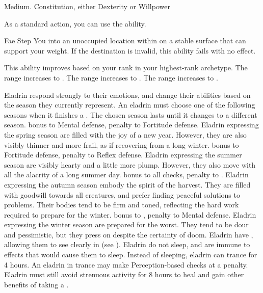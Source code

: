          Medium.
          Constitution, either  Dexterity or  Willpower
        \begin{raggeditemize}
             As a standard action, you can use the  ability.
            \begin{magicalactiveability}{Fae Step}
                \rankline
                You  into an unoccupied location within \shortrange on a stable surface that can support your weight.
                If the destination is invalid, this ability fails with no effect.

                \rankline
                This ability improves based on your rank in your highest-rank archetype.
                 The range increases to \medrange.
                 The range increases to \longrange.
                 The range increases to \distrange.
            \end{magicalactiveability}
             Eladrin respond strongly to their emotions, and change their abilities based on the season they currently represent.
                An eladrin must choose one of the following seasons when it finishes a .
                The chosen season lasts until it changes to a different season.
                  bonus to Mental defense,  penalty to Fortitude defense.
                Eladrin expressing the spring season are filled with the joy of a new year.
                However, they are also visibly thinner and more frail, as if recovering from a long winter.
                  bonus to Fortitude defense,  penalty to Reflex defense.
                Eladrin expressing the summer season are visibly hearty and a little more plump.
                However, they also move with all the alacrity of a long summer day.
                  bonus to all checks,  penalty to .
                Eladrin expressing the autumn season embody the spirit of the harvest.
                They are filled with goodwill towards all creatures, and prefer finding peaceful solutions to problems.
                Their bodies tend to be firm and toned, reflecting the hard work required to prepare for the winter.
                  bonus to ,  penalty to Mental defense.
                Eladrin expressing the winter season are prepared for the worst.
                They tend to be dour and pessimistic, but they press on despite the certainty of doom.
             Eladrin have , allowing them to see clearly in  (see ).
             Eladrin do not sleep, and are immune to \magical effects that would cause them to sleep.
                Instead of sleeping, eladrin can trance for 4 hours.
                An eladrin in trance may make Perception-based checks at a  penalty.
                Eladrin must still avoid strenuous activity for 8 hours to heal and gain other benefits of taking a .
        \end{raggeditemize}
